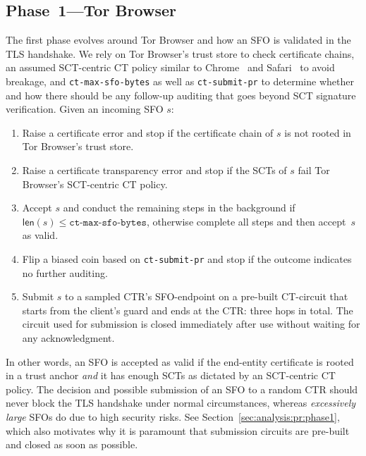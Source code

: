 \subsection{Phase~1---Tor Browser} \label{sec:base:phase1}
The first phase evolves around Tor Browser and how an SFO is validated in the
TLS handshake.  We rely on Tor Browser's trust store to check certificate
chains, an assumed SCT-centric CT policy similar to Chrome~\cite{chrome-policy}
and Safari~\cite{safari-policy} to avoid breakage, and \texttt{ct-max-sfo-bytes}
as well as \texttt{ct-submit-pr} to determine whether and how there should be
any follow-up auditing that goes beyond SCT signature verification.  Given an
incoming SFO $s$:

\begin{enumerate}
	\item Raise a certificate error and stop if the certificate chain of $s$
		is not rooted in Tor Browser's trust store.
	\item Raise a certificate transparency error and stop if the SCTs of $s$
		fail Tor Browser's SCT-centric CT policy.
	\item Accept $s$ and conduct the remaining steps in the background if
		$\mathsf{len}(s) \le \texttt{ct-max-sfo-bytes}$, otherwise complete
		all steps and then accept~$s$ as valid.
	\item Flip a biased coin based on \texttt{ct-submit-pr} and stop if the
		outcome indicates no further auditing.
	\item Submit $s$ to a sampled CTR's SFO-endpoint on a pre-built CT-circuit
		that starts from the client's guard and ends at the CTR: three hops in
		total.  The circuit used for submission is closed immediately after
		use without waiting for any acknowledgment.
\end{enumerate}

In other words, an SFO is accepted as valid if the end-entity certificate is
rooted in a trust anchor \emph{and} it has enough SCTs as dictated by an
SCT-centric CT policy.  The decision and possible submission of an SFO to a
random CTR should never block the TLS handshake under normal circumstances,
whereas \emph{excessively large} SFOs do due to high security risks.  See
Section~\ref{sec:analysis:pr:phase1}, which also motivates why it is paramount
that submission circuits are pre-built and closed as soon as possible.

%
%


